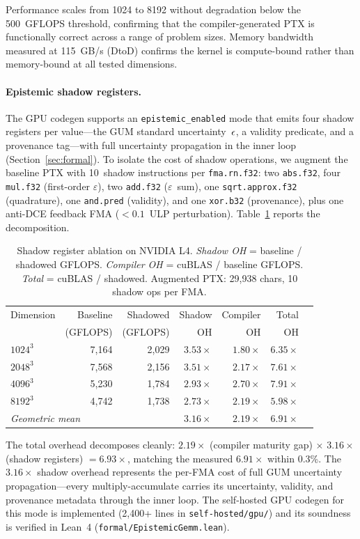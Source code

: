 Performance scales from 1024 to 8192 without degradation below the
500~GFLOPS threshold, confirming that the compiler-generated PTX is
functionally correct across a range of problem sizes.  Memory bandwidth
measured at 115~GB/s (DtoD) confirms the kernel is compute-bound rather
than memory-bound at all tested dimensions.

\paragraph{Epistemic shadow registers.}
The \sounio GPU codegen supports an \texttt{epistemic\_enabled} mode
that emits four shadow registers per value---the GUM standard
uncertainty~$\epsilon$, a validity predicate, and a provenance tag---with
full uncertainty propagation in the inner loop
(Section~\ref{sec:formal}).  To isolate the cost of shadow operations,
we augment the baseline PTX with 10~shadow instructions per
\texttt{fma.rn.f32}: two \texttt{abs.f32}, four \texttt{mul.f32}
(first-order $\varepsilon$), two \texttt{add.f32} ($\varepsilon$~sum),
one \texttt{sqrt.approx.f32} (quadrature), one \texttt{and.pred}
(validity), and one \texttt{xor.b32} (provenance), plus one anti-DCE
feedback FMA ($<\!0.1$~ULP perturbation).
Table~\ref{tab:gpu-ablation} reports the decomposition.

\begin{table}[t]
\centering
\caption{Shadow register ablation on NVIDIA L4.
  \emph{Shadow OH} = baseline / shadowed GFLOPS.
  \emph{Compiler OH} = cuBLAS / baseline GFLOPS.
  \emph{Total} = cuBLAS / shadowed.
  Augmented PTX: 29{,}938 chars, 10 shadow ops per FMA.}
\label{tab:gpu-ablation}
\begin{tabular}{lrrrrrr}
\toprule
Dimension & Baseline & Shadowed & Shadow & Compiler & Total \\
          & (GFLOPS) & (GFLOPS) & OH     & OH       & OH    \\
\midrule
$1024^3$ & 7{,}164 & 2{,}029 & $3.53\times$ & $1.80\times$ & $6.35\times$ \\
$2048^3$ & 7{,}568 & 2{,}156 & $3.51\times$ & $2.17\times$ & $7.61\times$ \\
$4096^3$ & 5{,}230 & 1{,}784 & $2.93\times$ & $2.70\times$ & $7.91\times$ \\
$8192^3$ & 4{,}742 & 1{,}738 & $2.73\times$ & $2.19\times$ & $5.98\times$ \\
\midrule
\multicolumn{3}{l}{\emph{Geometric mean}} & $3.16\times$ & $2.19\times$ & $6.91\times$ \\
\bottomrule
\end{tabular}
\end{table}

The total overhead decomposes cleanly: $2.19\times$ (compiler maturity
gap) $\times$ $3.16\times$ (shadow registers) $= 6.93\times$, matching
the measured $6.91\times$ within 0.3\%.  The $3.16\times$ shadow
overhead represents the per-FMA cost of full GUM uncertainty
propagation---every multiply-accumulate carries its uncertainty,
validity, and provenance metadata through the inner loop.  The
self-hosted GPU codegen for this mode is implemented (2{,}400+ lines
in \texttt{self-hosted/gpu/}) and its soundness is verified in Lean~4
(\texttt{formal/EpistemicGemm.lean}).
